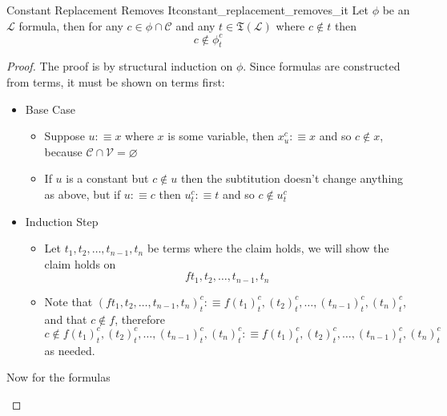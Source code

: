 \begin{lemma}{Constant Replacement Removes It}{constant_replacement_removes_it}
Let $ \phi  $ be an $ \mathcal{ L }   $ formula, then for any $ c \in  \phi \cap  \mathcal{ C }  $ and any $ t \in  \mathfrak{ T } \left( \mathcal{ L }   \right)   $ where $ c \not\in t $ then 
\[
 c \not\in \phi _{ t }^{ c } 
\]
\end{lemma}
\begin{proof}
    The proof is by structural induction on $ \phi  $. Since formulas are constructed from terms, it must be shown on terms first:
    \begin{itemize}
        \item Base Case
        \begin{itemize}
            \item Suppose $ u :\equiv x $ where $ x $ is some variable, then $ x _{ u }^{ c } :\equiv x $ and so $ c \not\in x $, because $ \mathcal{ C } \cap \mathcal{ V } = \varnothing    $ 
            \item If $ u $ is a constant but $ c \not\in u $ then the subtitution doesn't change anything as above, but if $ u :\equiv  c $ then $ u _{ t }^{ c } :\equiv t   $ and so $ c \not\in u _{ t }^{ c }  $ 
        \end{itemize}
        \item Induction Step
        \begin{itemize}
            \item Let $ t_{1} , t_{2} , \dotsc  , t_{n - 1} , t_{n} $ be terms where the claim holds, we will show the claim holds on 
            \[
            f  t_{1} , t_{2} , \dotsc  , t_{n - 1} , t_{n} 
            \]
            \item Note that  $ \left(  f  t_{1} , t_{2} , \dotsc  , t_{n - 1} , t_{n}   \right) _{ t }^{ c } :\equiv f \left( t_{1} \right) _{ t }^{ c }, \left( t_{2} \right) _{ t }^{ c }, \ldots, \left( t_{n-1} \right) _{ t }^{ c }, \left( t_{n} \right) _{ t }^{ c }   $, and that $ c \not\in f $, therefore $ c \not\in f \left( t_{1} \right) _{ t }^{ c }, \left( t_{2} \right) _{ t }^{ c }, \ldots, \left( t_{n-1} \right) _{ t }^{ c }, \left( t_{n} \right) _{ t }^{ c }  :\equiv  f \left( t_{1} \right) _{ t }^{ c }, \left( t_{2} \right) _{ t }^{ c }, \ldots, \left( t_{n-1} \right) _{ t }^{ c }, \left( t_{n} \right) _{ t }^{ c }     $ as needed.
        \end{itemize}
    \end{itemize}
    Now for the formulas
    \begin{itemize}

\end{itemize}
\end{proof}
